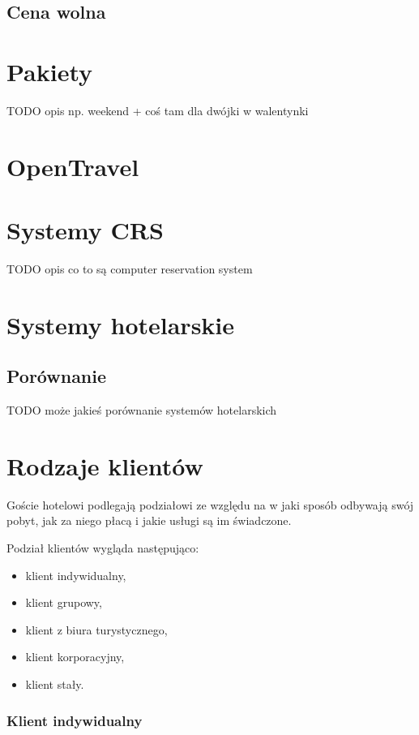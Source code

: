 \documentclass[a4paper,onecolumn,oneside,11pt,wide,floatssmall]{mwrep}
\theoremstyle{definition}
\theoremstyle{plain}%
\theoremstyle{remark}
\begin{document}
\subsection{Cena wolna}

\section{Pakiety}

TODO opis np. weekend + coś tam dla dwójki w walentynki

\section{OpenTravel}

\section{Systemy CRS}
TODO opis co to są computer reservation system

\section{Systemy hotelarskie}

\subsection{Porównanie}
TODO może jakieś porównanie systemów hotelarskich

\section{Rodzaje klientów}
\label{rodzaje-klientow}
Goście hotelowi podlegają podziałowi ze względu na w jaki sposób odbywają 
swój pobyt, jak za niego płacą i jakie usługi są im świadczone.

Podział klientów wygląda następująco:

\begin{itemize}
  \item klient indywidualny,
  \item klient grupowy,
  \item klient z biura turystycznego,
  \item klient korporacyjny,
  \item klient stały.
\end{itemize}

\subsubsection{Klient indywidualny}
\end{document}
